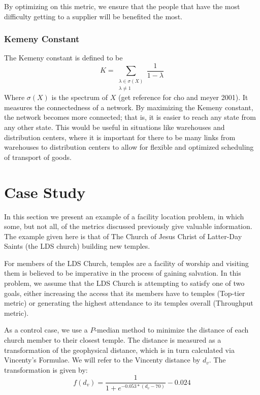 \documentclass[twoside,twocolumn]{article}
\begin{document}
By optimizing on this metric, we ensure that the people that have the most difficulty getting to a supplier will be benefited the most.

\subsubsection{Kemeny Constant}
The Kemeny constant is defined to be 
$$K = \sum_{\substack{\lambda \in \sigma(X) \\ \lambda \neq 1}} \frac{1}{1-\lambda}$$
Where $\sigma(X)$ is the spectrum of $X$ (get reference for cho and meyer 2001).
It measures the connectedness of a network.
By maximizing the Kemeny constant, the network becomes more connected; that is, it is easier to reach any state from any other state.
This would be useful in situations like warehouses and distribution centers, where it is important for there to be many links from warehouses to distribution centers to allow for flexible and optimized scheduling of transport of goods.

\section{Case Study}

In this section we present an example of a facility location problem, in which some, but not all, of the metrics discussed previously give valuable information. 
The example given here is that of The Church of Jesus Christ of Latter-Day Saints (the LDS church) building new temples.

For members of the LDS Church, temples are a facility of worship and visiting them is believed to be imperative in the process of gaining salvation.
In this problem, we assume that the LDS Church is attempting to satisfy one of two goals, either increasing the access that its members have to temples (Top-tier metric) or generating the highest attendance to its temples overall (Throughput metric).

As a control case, we use a $P$-median method to minimize the distance of each church member to their closest temple.
The distance is measured as a transformation of the geophysical distance, which is in turn calculated via Vincenty's Formulae. %
We will refer to the Vincenty distance by $d_{v}$. %
The transformation is given by:
\begin{equation*}
f(d_{v}) = \frac{1}{1+e^{-0.053*(d_{v} - 70)}} - 0.024
\end{equation*}
\end{document}

